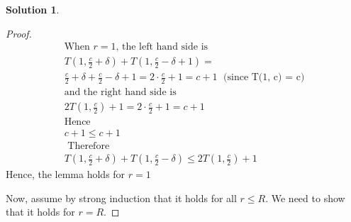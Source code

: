 \documentclass{article}
\theoremstyle{definition}
\newtheorem*{solution}{Solution}
\begin{document}
\begin{solution}
\begin{proof}
\begin{gather*}
\text{When $r = 1$, the left hand side is } \\
T \left(1, \frac{c}{2} + \delta\right) + T \left(1, \frac{c}{2} - \delta + 1 \right) =  \\
\frac{c}{2} + \delta + \frac{c}{2} - \delta + 1= 2 \cdot \frac{c}{2} + 1= c + 1 \; \text{ (since T(1, c) = c)} \\
\text{and the right hand side is} \\
2T \left(1, \frac{c}{2} \right) + 1= 2 \cdot \frac c 2 + 1= c + 1\\
\text{Hence}\\
c + 1\leq c + 1 \\
\text{ Therefore } \\
T \left(1, \frac{c}{2} + \delta\right) + T \left(1, \frac{c}{2} - \delta \right) \leq 2T \left(1, \frac{c}{2} \right) + 1
\end{gather*}
Hence, the lemma holds for $r = 1$


Now, assume by strong induction that it holds for all $r \leq R$. We need to show that it holds for $r = R$.


\end{proof}
\end{solution}
\end{document}
